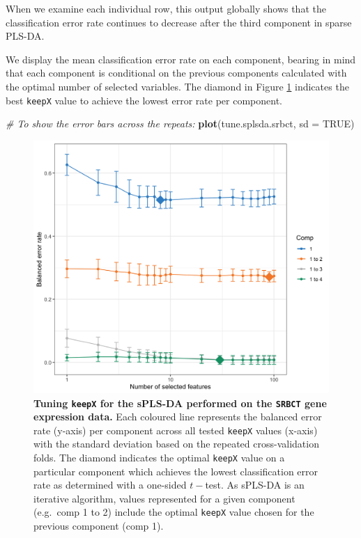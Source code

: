 \documentclass[]{book}
\newenvironment{Shaded}{\begin{snugshade}}{\end{snugshade}}
\newcommand{\KeywordTok}[1]{\textcolor[rgb]{0.13,0.29,0.53}{\textbf{#1}}}
\newcommand{\DataTypeTok}[1]{\textcolor[rgb]{0.13,0.29,0.53}{#1}}
\newcommand{\CommentTok}[1]{\textcolor[rgb]{0.56,0.35,0.01}{\textit{#1}}}
\newcommand{\OtherTok}[1]{\textcolor[rgb]{0.56,0.35,0.01}{#1}}
\newcommand{\NormalTok}[1]{#1}
\begin{document}
When we examine each individual row, this output globally shows that the
classification error rate continues to decrease after the third
component in sparse PLS-DA.

We display the mean classification error rate on each component, bearing
in mind that each component is conditional on the previous components
calculated with the optimal number of selected variables. The diamond in
Figure \ref{fig:splsda-tune} indicates the best \texttt{keepX} value to
achieve the lowest error rate per component.

\begin{Shaded}
\begin{Highlighting}[]
\CommentTok{# To show the error bars across the repeats:}
\KeywordTok{plot}\NormalTok{(tune.splsda.srbct, }\DataTypeTok{sd =} \OtherTok{TRUE}\NormalTok{)}
\end{Highlighting}
\end{Shaded}

\begin{figure}

{\centering \includegraphics[width=0.5\linewidth]{Figures/PLSDA/splsda-tune-1} 

}

\caption{\textbf{Tuning \texttt{keepX} for the sPLS-DA
performed on the \texttt{SRBCT} gene expression data.} Each coloured
line represents the balanced error rate (y-axis) per component across
all tested \texttt{keepX} values (x-axis) with the standard deviation
based on the repeated cross-validation folds. The diamond indicates the
optimal \texttt{keepX} value on a particular component which achieves
the lowest classification error rate as determined with a one-sided
\(t-\)test. As sPLS-DA is an iterative algorithm, values represented for
a given component (e.g.~comp 1 to 2) include the optimal \texttt{keepX}
value chosen for the previous component (comp 1).}\label{fig:splsda-tune}
\end{figure}
\end{document}
